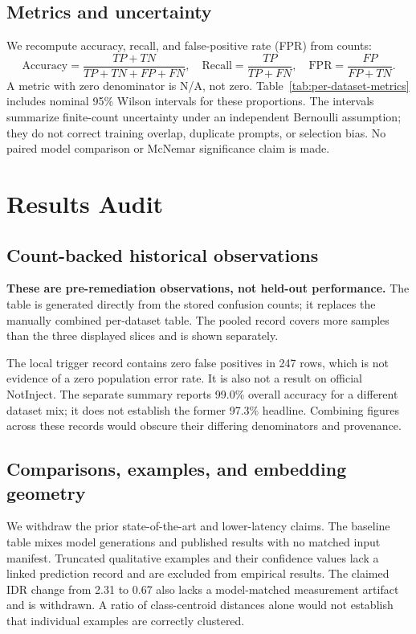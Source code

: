 \documentclass[11pt, a4paper]{article}
\begin{document}
\subsection{Metrics and uncertainty}
We recompute accuracy, recall, and false-positive rate (FPR) from counts:
\begin{equation}
\mathrm{Accuracy}=\frac{TP+TN}{TP+TN+FP+FN},\quad
\mathrm{Recall}=\frac{TP}{TP+FN},\quad
\mathrm{FPR}=\frac{FP}{FP+TN}.
\end{equation}
A metric with zero denominator is N/A, not zero. Table~\ref{tab:per-dataset-metrics}
includes nominal 95\% Wilson intervals for these proportions. The intervals
summarize finite-count uncertainty under an independent Bernoulli assumption;
they do not correct training overlap, duplicate prompts, or selection bias.
No paired model comparison or McNemar significance claim is made.

\section{Results Audit}

\subsection{Count-backed historical observations}
\textbf{These are pre-remediation observations, not held-out performance.}
The table is generated directly from the stored confusion counts; it
replaces the manually combined per-dataset table. The pooled record covers
more samples than the three displayed slices and is shown separately.



The local trigger record contains zero false positives in 247 rows, which
is not evidence of a zero population error rate. It is also not a result
on official NotInject. The separate
 summary reports 99.0\% overall
accuracy for a different dataset mix; it does not establish the former
97.3\% headline. Combining figures across these records would obscure
their differing denominators and provenance.

\subsection{Comparisons, examples, and embedding geometry}
We withdraw the prior state-of-the-art and lower-latency claims. The
baseline table mixes model generations and published results with no
matched input manifest. Truncated qualitative examples and their confidence
values lack a linked prediction record and are excluded from empirical
results. The claimed IDR change from 2.31 to 0.67 also lacks a model-matched
measurement artifact and is withdrawn. A ratio of class-centroid distances
alone would not establish that individual examples are correctly clustered.
\end{document}
